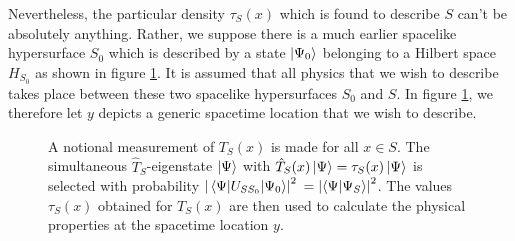 Nevertheless, the particular density $\tau_S(x)$ which is found to describe $S$ can't be absolutely anything. Rather, we suppose there is a much earlier spacelike hypersurface $S_0$ which is described by a state $\ket{\Psi_0}$ belonging to a Hilbert space $H_{S_0}$ as shown in figure \ref{S1}.  It is assumed that all physics that we wish to describe takes place between these two spacelike hypersurfaces $S_0$ and $S$. In figure \ref{S1}, we therefore let $y$ depicts a generic spacetime location that we wish to describe. 

 \begin{figure}[ht!]
\captionsetup{justification=justified}
\centering



\vspace*{2px}
\caption{A notional measurement of $T_S(x)$ is made for all $x\in S$. The simultaneous  $\hat{T}_S$-eigenstate $\ket{\Psi}$ with $\hat{T}_S(x)\ket{\Psi}=\tau_S(x)\ket{\Psi}$ is selected with probability $\abs{\mel{\Psi}{U_{SS_0}}{\Psi_0}}^2$ $=\abs{\ip{\Psi}{\Psi_S}}^2$. The values $\tau_S(x)$ obtained for $T_S(x)$ are then used to calculate the physical properties at the spacetime location $y$.  }
\label{S1}
\end{figure} 
\vspace*{-12px}




